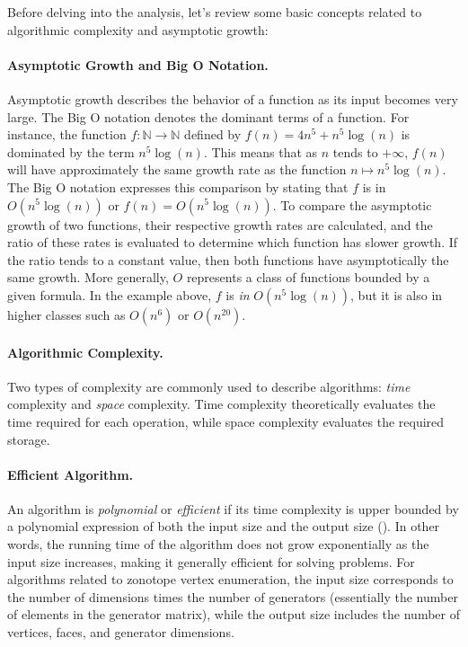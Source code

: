 Before delving into the analysis, let's review some basic concepts related to algorithmic complexity and asymptotic growth:

\paragraph*{Asymptotic Growth and Big O Notation.} Asymptotic growth describes the behavior of a function as its input becomes very large. The Big O notation denotes the dominant terms of a function. For instance, the function $f\colon \mathbb{N} \rightarrow \mathbb{N}$ defined by $f(n) = 4n^5 + n^5\log (n)$ is dominated by the term $n^5\log(n)$. This means that as $n$ tends to $+\infty$, $f(n)$ will have approximately the same growth rate as the function $n\mapsto n^5\log(n)$. The Big O notation expresses this comparison by stating that $f$ is in $O(n^5\log(n))$ or $f(n) = O(n^5\log(n))$. To compare the asymptotic growth of two functions, their respective growth rates are calculated, and the ratio of these rates is evaluated to determine which function has slower growth. If the ratio tends to a constant value, then both functions have asymptotically the same growth. More generally, $O$ represents a class of functions bounded by a given formula. In the example above, $f$ is \emph{in} $O(n^5\log(n))$, but it is also in higher classes such as $O(n^6)$ or $O(n^{20})$.

\paragraph*{Algorithmic Complexity.} Two types of complexity are commonly used to describe algorithms: \emph{time} complexity and \emph{space} complexity. Time complexity theoretically evaluates the time required for each operation, while space complexity evaluates the required storage.

\paragraph*{Efficient Algorithm.} An algorithm is \emph{polynomial} or \emph{efficient} if its time complexity is upper bounded by a polynomial expression of both the input size and the output size (\cite{fukudaZonotopeConstructionMinkowski2004a}). In other words, the running time of the algorithm does not grow exponentially as the input size increases, making it generally efficient for solving problems. For algorithms related to zonotope vertex enumeration, the input size corresponds to the number of dimensions times the number of generators (essentially the number of elements in the generator matrix), while the output size includes the number of vertices, faces, and generator dimensions.

